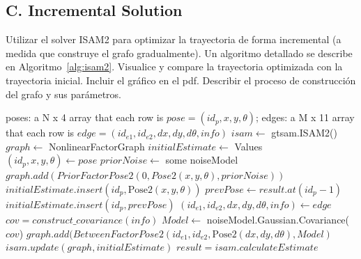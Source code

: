 \documentclass[tp]{lcc}
\begin{document}
\subsection{C. Incremental Solution}
\label{sec:incremental_solution}
Utilizar el solver ISAM2 para optimizar la trayectoria de forma incremental (a medida que construye el grafo gradualmente). Un algoritmo detallado se describe en Algoritmo~\ref{alg:isam2}. Visualice y compare la trayectoria optimizada con la trayectoria inicial. Incluir el gráfico en el pdf. Describir el proceso de construcción del grafo y sus parámetros.

\begin{algorithm}
    \caption{\lstinline[style=bash]{incremental_solution_2d(poses, edges)}}
    \label{alg:isam2}
    \begin{algorithmic}[1]    
    \Require poses: a N x 4 array that each row is $pose=(id_{p},x,y,\theta)$; edges: a M x 11 array that each row is $edge=(id_{e1},id_{e2},dx,dy,d\theta,info)$
    \State $isam \leftarrow$ gtsam.ISAM2() 
        \State $graph \leftarrow$ NonlinearFactorGraph 
        \State $initialEstimate \leftarrow$ Values 
        \State $(id_{p},x,y,\theta) \gets pose$ 
            \State $priorNoise \leftarrow$ some noiseModel 
            \State $graph.add(PriorFactorPose2(0,Pose2(x,y,\theta),priorNoise))$
            \State $initialEstimate.insert(id_{p},\text{Pose2}(x,y,\theta))$
        \Else {}
            \State $prevPose \gets result.at(id_{p}-1)$ 
            \State $initialEstimate.insert(id_{p},prevPose)$
        \EndIf
            \State $(id_{e1},id_{e2},dx,dy,d\theta,info) \gets edge$ 
                \State $cov=construct\_covariance(info)$ 
                \State $Model \leftarrow$ noiseModel.Gaussian.Covariance($cov$)
                \State $graph.add(BetweenFactorPose2(id_{e1},id_{e2},\text{Pose2}(dx,dy,d\theta),Model)$
            \EndIf
        \EndFor
        \State $isam.update(graph,initialEstimate)$
        \State $result=isam.calculateEstimate$
    \EndFor
    \end{algorithmic}
\end{algorithm}
\end{document}
